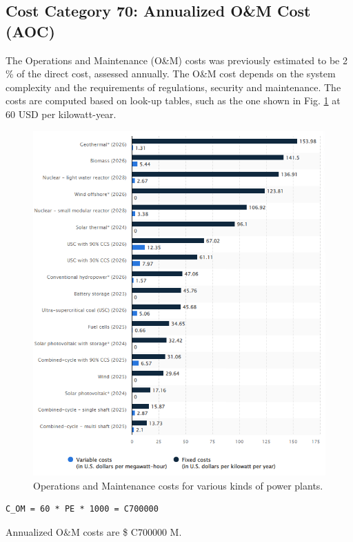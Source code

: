 \subsection{Cost Category 70: Annualized O\&M Cost (AOC)}

The Operations and Maintenance (O\&M) costs was previously estimated to be 2 \% of the direct cost, assessed annually.  The O\&M cost depends on the system complexity and the requirements of regulations, security and maintenance. The costs are computed based on look-up tables, such as the one shown in Fig. \ref{fig:statista} at 60 USD per kilowatt-year.  

\begin{figure}[b!] 
\centering 
\includegraphics[scale=0.5]{StandardFigures/statista.png} 
\caption{Operations and Maintenance costs for various kinds of power plants.} 
\label{fig:statista} 
\end{figure} 

\begin{verbatim} 
C_OM = 60 * PE * 1000 = C700000  
\end{verbatim} 

Annualized O\&M costs are \$ C700000 M.

